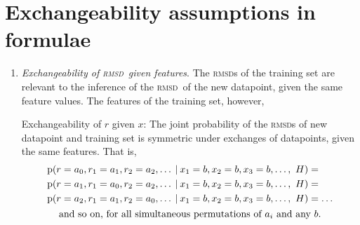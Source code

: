 \documentclass[\ifafour a4paper,12pt,\else a5paper,10pt,\fi%
onecolumn,oneside,article,%
british%
]{memoir}
\theoremstyle{remark}
\theoremstyle{innote}
\newcommand*{\p}{\mathrm{p}}%
\renewcommand*{\|}[1][]{\nonscript\:#1\vert\nonscript\:\mathopen{}}
\renewcommand*{\=}{\TextOrMath\texteq\eq}
\newcommand*{\rmsd}{\textsc{rmsd}}
\begin{document}
\section{Exchangeability assumptions in formulae}
\label{sec:exch_formulae}


\begin{enumerate}[label=\roman*.]
\item\label{item:exch_rx}\emph{Exchangeability of \rmsd\ given features}.
  The \rmsd s of the training set are relevant to the inference of the
  \rmsd\ of the new datapoint, given the same feature values. The features
  of the training set, however,

  Exchangeability of $r$ given $x$: The joint
  probability of the \rmsd s of new datapoint and training set is symmetric
  under exchanges of datapoints, given the same features. That is,
  \begin{multline}
    \label{eq:p_exch_rx}
    \begin{aligned}
    &\p(r=a_{0}, r_{1}=a_{1}, r_{2}=a_{2}, \dotsc \|
    x_{1}=b, x_{2}=b, x_{3}=b, \dotsc,\ H) ={}\\
    &\p(r=a_{1}, r_{1}=a_{0}, r_{2}=a_{2}, \dotsc \|
    x_{1}=b, x_{2}=b, x_{3}=b, \dotsc,\ H) ={}\\
    &\p(r=a_{2}, r_{1}=a_{1}, r_{2}=a_{0}, \dotsc \|
    x_{1}=b, x_{2}=b, x_{3}=b, \dotsc,\ H) = \dotso
    \end{aligned} \\
    \text{and so on, for all simultaneous permutations of $a_{i}$ and any $b$.}
  \end{multline}


\end{enumerate}
\end{document}
